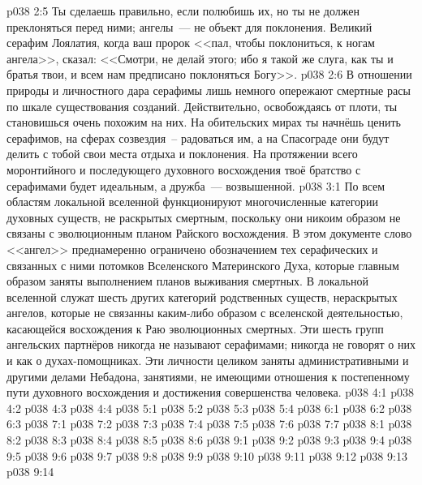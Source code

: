 \vs p038 2:5 \pc Ты сделаешь правильно, если полюбишь их, но ты не должен преклоняться перед ними; ангелы~--- не объект для поклонения. Великий серафим Лоялатия, когда ваш пророк <<пал, чтобы поклониться, к ногам ангела>>, сказал: <<Смотри, не делай этого; ибо я такой же слуга, как ты и братья твои, и всем нам предписано поклоняться Богу>>.
\vs p038 2:6 В отношении природы и личностного дара серафимы лишь немного опережают смертные расы по шкале существования созданий. Действительно, освобождаясь от плоти, ты становишься очень похожим на них. На обительских мирах ты начнёшь ценить серафимов, на сферах созвездия~-- радоваться им, а на Спасограде они будут делить с тобой свои места отдыха и поклонения. На протяжении всего моронтийного и последующего духовного восхождения твоё братство с серафимами будет идеальным, а дружба~--- возвышенной.
\vs p038 3:1 По всем областям локальной вселенной функционируют многочисленные категории духовных существ, не раскрытых смертным, поскольку они никоим образом не связаны с эволюционным планом Райского восхождения. В этом документе слово <<ангел>> преднамеренно ограничено обозначением тех серафических и связанных с ними потомков Вселенского Материнского Духа, которые главным образом заняты выполнением планов выживания смертных. В локальной вселенной служат шесть других категорий родственных существ, нераскрытых ангелов, которые не связанны каким\hyp{}либо образом с вселенской деятельностью, касающейся восхождения к Раю эволюционных смертных. Эти шесть групп ангельских партнёров никогда не называют серафимами; никогда не говорят о них и как о духах\hyp{}помощниках. Эти личности целиком заняты административными и другими делами Небадона, занятиями, не имеющими отношения к постепенному пути духовного восхождения и достижения совершенства человека.
\vs p038 4:1 
\vs p038 4:2 
\vs p038 4:3 \pc 
\vs p038 4:4 
\vs p038 5:1 
\vs p038 5:2 
\vs p038 5:3 
\vs p038 5:4 
\vs p038 6:1 
\vs p038 6:2 
\vs p038 6:3 
\vs p038 7:1 
\vs p038 7:2 
\vs p038 7:3 \pc 
\vs p038 7:4 
\vs p038 7:5 \pc 
\vs p038 7:6 \pc 
\vs p038 7:7 
\vs p038 8:1 
\vs p038 8:2 
\vs p038 8:3 
\vs p038 8:4 
\vs p038 8:5 \pc 
\vs p038 8:6 
\vs p038 9:1 
\vs p038 9:2 
\vs p038 9:3 
\vs p038 9:4 
\vs p038 9:5 \pc 
\vs p038 9:6 
\vs p038 9:7 
\vs p038 9:8 
\vs p038 9:9 
\vs p038 9:10 \pc 
\vs p038 9:11 
\vs p038 9:12 
\vs p038 9:13 \pc 
\vsetoff
\vs p038 9:14 
\quizlink
